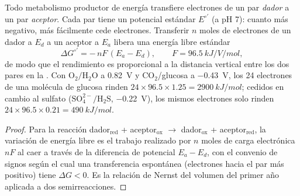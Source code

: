 \begin{theorem}\label{thm:b2:microbial-metabolism:redox}
Todo metabolismo productor de energía transfiere electrones de un par
\emph{dador} a un par \emph{aceptor}. Cada par tiene un potencial estándar
$E^{\circ\prime}$ (a pH 7): cuanto más negativo, más fácilmente cede
electrones. Transferir $n$ moles de electrones de un dador a $E_d$ a un
aceptor a $E_a$ libera una energía libre estándar
\[
\Delta G^{\circ\prime} = -\,n F\,(E_a - E_d), \qquad F = \qty{96.5}{kJ/V/mol},
\]
de modo que el rendimiento es proporcional a la distancia vertical entre
los dos pares en la \emph{}. Con
$\mathrm{O_2/H_2O}$ a \qty{+0.82}{V} y $\mathrm{CO_2}$/glucosa a
\qty{-0.43}{V}, los 24 electrones de una molécula de glucosa rinden
$24\times 96.5\times 1.25 = \qty{2900}{kJ/mol}$; cedidos en cambio al
sulfato ($\mathrm{SO_4^{2-}/H_2S}$, \qty{-0.22}{V}), los mismos
electrones solo rinden $24\times 96.5\times 0.21 = \qty{490}{kJ/mol}$.
\end{theorem}
\begin{proof}
Para la reacción dador$_{\text{red}}$ + aceptor$_{\text{ox}}$
$\to$ dador$_{\text{ox}}$ + aceptor$_{\text{red}}$, la variación de energía
libre es el trabajo realizado por $n$ moles de carga electrónica $nF$ al
caer a través de la diferencia de potencial $E_a - E_d$, con el convenio
de signos según el cual una transferencia espontánea (electrones hacia el
par más positivo) tiene $\Delta G < 0$. Es la relación de Nernst del
volumen del primer año aplicada a dos semirreacciones.
\end{proof}

